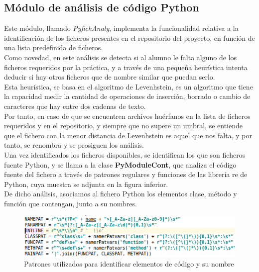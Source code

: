 \subsection{Módulo de análisis de código Python}

Este módulo, llamado \textit{PyfichAnaly}, implementa la funcionalidad relativa a la identificación de los ficheros presentes en el repositorio del proyecto, en función de una lista predefinida de ficheros.\\


Como novedad, en este análisis se detecta si al alumno le falta alguno de los ficheros requeridos por la práctica, y a través de una pequeña heurística intenta deducir si hay otros ficheros que de nombre similar que puedan serlo.\\


Esta heurística, se basa en el algoritmo de Levenhstein, es un algoritmo que tiene la capacidad medir la cantidad de operaciones de inserción, borrado o cambio de caracteres que hay entre dos cadenas de texto.\\


Por tanto, en caso de que se encuentren archivos huérfanos en la lista de ficheros requeridos y en el repositorio, y siempre que no supere un umbral, se entiende que el fichero con la menor distancia de Levenhstein es aquel que nos falta, y por tanto, se renombra y se prosiguen los análisis.\\


Una vez identificados los ficheros disponibles, se identifican los que son ficheros fuente Python, y se llama a la clase \textbf{PyModuleCont}, que analiza el código fuente del fichero a través de patrones regulares y funciones de las librería re de Python, cuya muestra se adjunta en la figura inferior.\\


De dicho análisis, asociamos al fichero Python los elementos clase, método y función que contengan, junto a su nombres.\\


\begin{figure}[H]
   \centering
   \includegraphics[width=16cm]{img/Selection_022_pyanaly_regex}
   \caption{Patrones utilizados para identificar elementos de código y su nombre}
   \label{figura:regex}
\end{figure}

